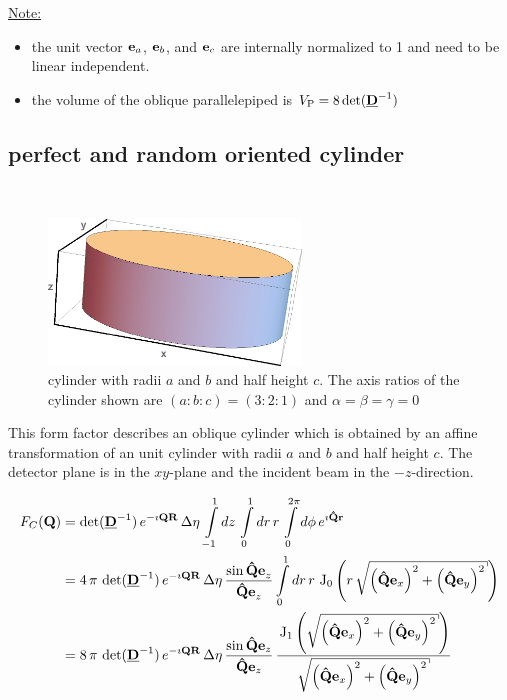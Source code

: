 \noindent\uline{Note:}
\begin{itemize}
\item the unit vector $\B{e}_a$, $\B{e}_b$, and $\B{e}_c$ are internally normalized to 1 and need to be linear independent.
\item the volume of the oblique parallelepiped is $V_\mathrm{P}=8\det(\M{D}^{-1})$
\end{itemize}

\subsection{perfect and random oriented cylinder} ~\\

\begin{figure}[htb]
\begin{center}
\includegraphics[width=0.6\textwidth]{../images/form_factor/supershapes/cylinder321.png}
\end{center}
\caption{cylinder with radii $a$ and $b$ and half height $c$. The axis ratios of the cylinder shown are $(a:b:c)=(3:2:1)$ and $\alpha=\beta=\gamma=0$}
\label{fig:opo_cylinder}
\end{figure}

This form factor describes an oblique cylinder which is obtained by an affine transformation of an unit cylinder with radii $a$ and $b$ and half height $c$. The detector plane is in the $xy$-plane and the incident beam in the $-z$-direction.


\begin{align}
F_C(\B{Q}) &=
\det(\M{D}^{-1})\, e^{-\imath\B{QR}}\, \Delta\eta\, \int\limits_{-1}^1
dz\, \int\limits_{0}^{1} dr\, r\, \int\limits_{0}^{2\pi} d\phi \,
e^{\imath\B{\hat{Q}r}} \nonumber \\
&=
4\, \pi\, \det(\M{D}^{-1})\, e^{-\imath\B{QR}}\, \Delta\eta\,
\frac{\sin\B{\hat{Q}e}_z}{\B{\hat{Q}e}_z}
\int\limits_{0}^1 dr\,r\,
\U{J}_0\left(r\, \sqrt{\left(\B{\hat{Q}}\B{e}_x\right)^2+
\left(\B{\hat{Q}}\B{e}_y\right)^2}\right)
\nonumber \\
&= \displaystyle
8\, \pi\,\det(\M{D}^{-1})\, e^{-\imath\B{QR}}\,
\Delta\eta\, \frac{\sin\B{\hat{Q}}\B{e}_z}{\B{\hat{Q}}\B{e}_z}
\, \frac{\U{J}_1\left(\sqrt{\left(\B{\hat{Q}}\B{e}_x\right)^2+
\left(\B{\hat{Q}}\B{e}_y\right)^2}\right)}{\sqrt{
\left(\B{\hat{Q}}\B{e}_x\right)^2+\left(\B{\hat{Q}}\B{e}_y\right)^2}}
\label{eq:form:C}
\end{align}

